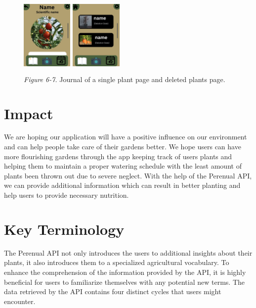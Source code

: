 \documentclass{sigchi}
\begin{document}
\begin{figure}[H]
    \centering
    \includegraphics[width=2.5cm, height=4cm]{PlantClicked}
        \includegraphics[width=2.5cm, height=4cm]{PlantHistory}
	\\\emph{Figure 6-7.} Journal of a single plant page and deleted plants page.
\end{figure}


\section{Impact}
We are hoping our application will have a positive influence on our environment and can help people take care of their gardens better. We hope users can have more flourishing gardens through the app keeping track of users plants and helping them to maintain a proper watering schedule with the least amount of plants been thrown out due to severe neglect. With the help of the Perenual API, we can provide additional information which can result in better planting and help users to provide necessary nutrition.

\section{Key Terminology}
The Perenual API not only introduces the users to additional insights about their plants, it also introduces them to a specialized agricultural vocabulary. To enhance the comprehension of the information provided by the API, it is highly beneficial for users to familiarize themselves with any potential new terms. The data retrieved by the API contains four distinct cycles that users might encounter. 
\end{document}
